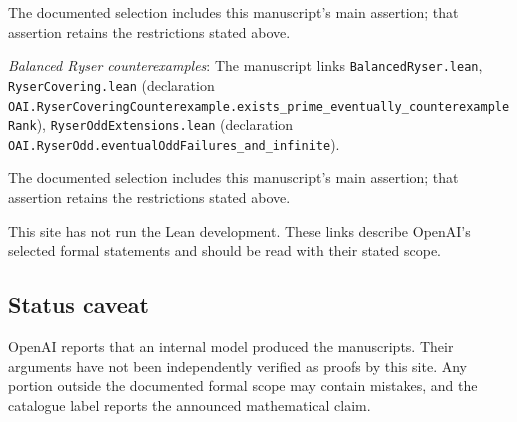 \documentclass[11pt]{article}
\begin{document}
The documented selection includes this manuscript’s main assertion; that assertion retains the restrictions stated above.

\textit{Balanced Ryser counterexamples}: The manuscript links \texttt{BalancedRyser.lean}, \texttt{RyserCovering.lean} (declaration \texttt{OAI.RyserCoveringCounterexample.exists\_prime\_eventually\_counterexampleRank}), \texttt{RyserOddExtensions.lean} (declaration \texttt{OAI.RyserOdd.eventualOddFailures\_and\_infinite}).

The documented selection includes this manuscript’s main assertion; that assertion retains the restrictions stated above.

This site has not run the Lean development. These links describe OpenAI’s selected formal statements and should be read with their stated scope.

\subsection{Status caveat}
OpenAI reports that an internal model produced the manuscripts. Their arguments have not been independently verified as proofs by this site. Any portion outside the documented formal scope may contain mistakes, and the catalogue label reports the announced mathematical claim.
\end{document}
